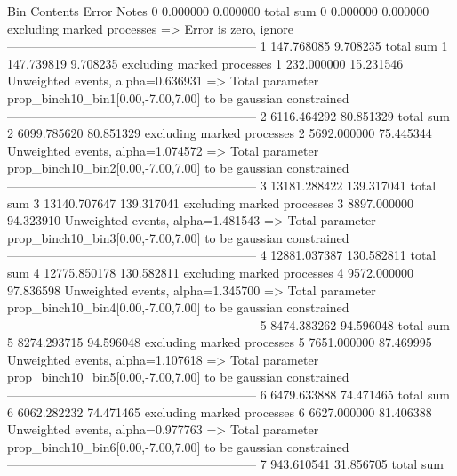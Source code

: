 Bin        Contents        Error           Notes                         
0          0.000000        0.000000        total sum                     
0          0.000000        0.000000        excluding marked processes    
  => Error is zero, ignore      
------------------------------------------------------------
1          147.768085      9.708235        total sum                     
1          147.739819      9.708235        excluding marked processes    
1          232.000000      15.231546       Unweighted events, alpha=0.636931
  => Total parameter prop_binch10_bin1[0.00,-7.00,7.00] to be gaussian constrained
------------------------------------------------------------
2          6116.464292     80.851329       total sum                     
2          6099.785620     80.851329       excluding marked processes    
2          5692.000000     75.445344       Unweighted events, alpha=1.074572
  => Total parameter prop_binch10_bin2[0.00,-7.00,7.00] to be gaussian constrained
------------------------------------------------------------
3          13181.288422    139.317041      total sum                     
3          13140.707647    139.317041      excluding marked processes    
3          8897.000000     94.323910       Unweighted events, alpha=1.481543
  => Total parameter prop_binch10_bin3[0.00,-7.00,7.00] to be gaussian constrained
------------------------------------------------------------
4          12881.037387    130.582811      total sum                     
4          12775.850178    130.582811      excluding marked processes    
4          9572.000000     97.836598       Unweighted events, alpha=1.345700
  => Total parameter prop_binch10_bin4[0.00,-7.00,7.00] to be gaussian constrained
------------------------------------------------------------
5          8474.383262     94.596048       total sum                     
5          8274.293715     94.596048       excluding marked processes    
5          7651.000000     87.469995       Unweighted events, alpha=1.107618
  => Total parameter prop_binch10_bin5[0.00,-7.00,7.00] to be gaussian constrained
------------------------------------------------------------
6          6479.633888     74.471465       total sum                     
6          6062.282232     74.471465       excluding marked processes    
6          6627.000000     81.406388       Unweighted events, alpha=0.977763
  => Total parameter prop_binch10_bin6[0.00,-7.00,7.00] to be gaussian constrained
------------------------------------------------------------
7          943.610541      31.856705       total sum                     
